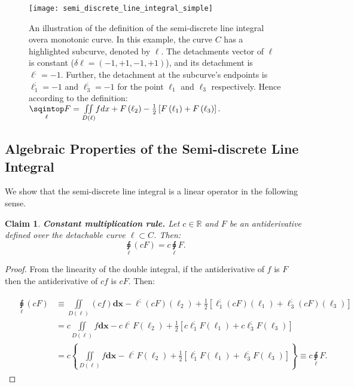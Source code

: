 \documentclass[11pt]{book}
\newtheorem{clm}[thm]{Claim}
\begin{document}
\begin{figure}
\texttt{[image: semi\_discrete\_line\_integral\_simple]}
\caption{An illustration of the definition of the semi-discrete line integral
overa monotonic curve. In this example, the curve $C$ has a highlighted
subcurve, denoted by $\ell$. The detachments vector of $\ell$ is constant
($\delta\ell=\left(-1,+1,-1,+1\right)$), and its detachment is $\ell^{;}=-1$.
Further, the detachment at the subcurve's endpoints
is $\ell_{1}^{;}=-1$ and $\ell_{3}^{;}=-1$ for the point $\ell_{1}$
and $\ell_{3}$ respectively. Hence according to the definition: $\underset{\ell}{\sqintop}F=\underset{D\left(\ell\right)}{\iint}fdx+F\left(\ell_{2}\right)-\frac{1}{2}\left[F\left(\ell_{1}\right)+F\left(\ell_{3}\right)\right].$}
\end{figure}
\subsection{Algebraic Properties of the Semi-discrete Line Integral}\label{semi_discrete_line_integral_algbebra}


We show that the semi-discrete line integral is a linear operator in the following sense.

\begin{clm}\textbf{Constant multiplication rule.} Let $c\in\mathbb{R}$ and $F$ be an antiderivative defined over the detachable curve $\ell\subset C$. Then:
$$\underset{\ell}{\sqint}\left(c F\right) = c\underset{\ell}{\sqint} F.$$
\end{clm}
\begin{proof}From the linearity of the double integral, if the antiderivative of $f$ is $F$ then the antiderivative of $c f$ is $c F$. Then:

\begin{align}
&\begin{aligned}
\underset{\ell}{\sqint}\left(cF\right) & \equiv\underset{D\left(\ell\right)}{\iint}\left(cf\right)\boldsymbol{dx}-\ell^{;}\left(cF\right)\left(\ell_{2}\right)+\frac{1}{2}\left[\ell_{1}^{;}\left(cF\right)\left(\ell_{1}\right)+\ell_{3}^{;}\left(cF\right)\left(\ell_{3}\right)\right]\\
 & =c\underset{D\left(\ell\right)}{\iint}f\boldsymbol{dx}-c\ell^{;}F\left(\ell_{2}\right)+\frac{1}{2}\left[c\ell_{1}^{;}F\left(\ell_{1}\right)+c\ell_{3}^{;}F\left(\ell_{3}\right)\right]\\
 & =c\left\{\underset{D\left(\ell\right)}{\iint}f\boldsymbol{dx}-\ell^{;}F\left(\ell_{2}\right)+\frac{1}{2}\left[\ell_{1}^{;}F\left(\ell_{1}\right)+\ell_{3}^{;}F\left(\ell_{3}\right)\right]\right\} \equiv c\underset{\ell}{\sqint}F.
\end{aligned}
\end{align}

\end{proof}
\end{document}
